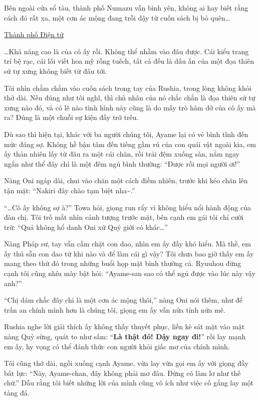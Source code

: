 \documentclass[../main.tex]{subfiles}
\begin{document}
Bên ngoài cửa sổ tàu, thành phố Numazu vẫn bình yên, không ai hay biết rằng cách đó rất xa, một cơn ác mộng đang trỗi dậy từ cuốn sách bị bỏ quên…

\begin{center}
  \uline{Thành phố Điện tử}
\end{center}

\dots Khả năng cao là của cô ấy rồi. Không thể nhầm vào đâu được. Cái kiểu trang trí bệ rạc, cái lối viết hoa mỹ rỗng tuếch, tất cả đều là dấu ấn của một đọa thiên sứ tự xưng không biết từ đâu tới.

Tôi nhìn chằm chằm vào cuốn sách trong tay của Rushia, trong lòng không khỏi thở dài. Nếu đúng như tôi nghĩ, thì chủ nhân của nó chắc chắn là đọa thiên sứ tự xưng nào đó, và có lẽ nào tình hình này cũng là do mấy trò hâm dở của cô ấy mà ra? Đúng là một chuỗi sự kiện đầy trớ trêu.

Dù sao thì hiện tại, khác với ba người chúng tôi, Ayame lại có vẻ bình tĩnh đến mức đáng sợ. Không hề bận tâm đến tiếng gầm rú của con quái vật ngoài kia, em ấy thản nhiên lấy từ đâu ra một cái chăn, rồi trải đệm xuống sàn, nằm ngay ngắn như thể đây chỉ là một đêm ngủ bình thường: ``Được rồi mọi người ơi!''

Nàng Oni ngáp dài, chui vào chăn một cách điềm nhiên, trước khi kéo chăn lên tận mặt: ``Nakiri đây chào tạm biệt nha\~{}.''

``\dots Cô ấy không sợ à?'' Towa hỏi, giọng run rẩy vì không hiểu nổi hành động của đàn chị. Tôi trố mắt nhìn cảnh tượng trước mặt, bên cạnh em gái tôi chỉ cười trừ: ``Quả không hổ danh Oni xứ Quỷ giới có khác\dots''

Nàng Pháp sư, tay vẫn cầm chặt con dao, nhìn em ấy đầy khó hiểu. Mà thề, em ấy thủ sẵn con dao từ khi nào và để làm cái gì vậy? Tôi chưa bao giờ thấy em ấy mang theo thứ đó trong những buổi họp mặt bình thường cả. Ryuuhou đứng cạnh tôi cũng nhíu mày bật hỏi: ``Ayame-san sao có thể ngủ được vào lúc này vậy anh?''

``Chị dám chắc đây chỉ là một cơn ác mộng thôi,'' nàng Oni nói thêm, như để trấn an chính mình hơn là chúng tôi, giọng em ấy vẫn nửa tỉnh nửa mê.

Rushia nghe lời giải thích ấy không thấy thuyết phục, liền kè sát mặt vào mặt nàng Quỷ sừng, quát to như sấm: ``\textbf{Là thật đó! Dậy ngay đi!}'' rồi lay mạnh em ấy, hy vọng có thể đánh thức con người khỏi giấc mơ của chính mình.


Tôi cũng thở dài, ngồi xuống cạnh Ayame, vừa lay vừa gọi em ấy với giọng đầy bất lực: ``Này, Ayame-chan, đây không phải mơ đâu. Đừng có làm lơ như thế chứ.'' Dẫu rằng tôi biết những lời của mình cũng vô ích như việc cố gắng lay một tảng đá.
\end{document}
